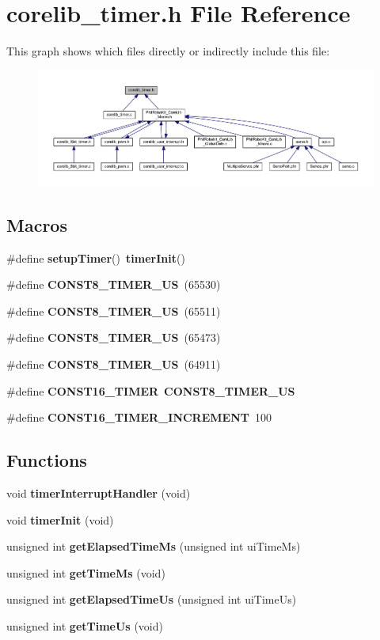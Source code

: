 \section{corelib\-\_\-timer.\-h File Reference}
\label{corelib__timer_8h}
This graph shows which files directly or indirectly include this file\-:\nopagebreak
\begin{figure}[H]
\begin{center}
\leavevmode
\includegraphics[width=350pt]{corelib__timer_8h__dep__incl}
\end{center}
\end{figure}
\subsection*{Macros}
\begin{DoxyCompactItemize}
\item 
\#define {\bf setup\-Timer}()~{\bf timer\-Init}()
\item 
\#define {\bf C\-O\-N\-S\-T8\-\_\-\-T\-I\-M\-E\-R\-\_\-U\-S}~(65530)
\item 
\#define {\bf C\-O\-N\-S\-T8\-\_\-\-T\-I\-M\-E\-R\-\_\-U\-S}~(65511)
\item 
\#define {\bf C\-O\-N\-S\-T8\-\_\-\-T\-I\-M\-E\-R\-\_\-U\-S}~(65473)
\item 
\#define {\bf C\-O\-N\-S\-T8\-\_\-\-T\-I\-M\-E\-R\-\_\-U\-S}~(64911)
\item 
\#define {\bf C\-O\-N\-S\-T16\-\_\-\-T\-I\-M\-E\-R}~{\bf C\-O\-N\-S\-T8\-\_\-\-T\-I\-M\-E\-R\-\_\-U\-S}
\item 
\#define {\bf C\-O\-N\-S\-T16\-\_\-\-T\-I\-M\-E\-R\-\_\-\-I\-N\-C\-R\-E\-M\-E\-N\-T}~100
\end{DoxyCompactItemize}
\subsection*{Functions}
\begin{DoxyCompactItemize}
\item 
void {\bf timer\-Interrupt\-Handler} (void)
\item 
void {\bf timer\-Init} (void)
\item 
unsigned int {\bf get\-Elapsed\-Time\-Ms} (unsigned int ui\-Time\-Ms)
\item 
unsigned int {\bf get\-Time\-Ms} (void)
\item 
unsigned int {\bf get\-Elapsed\-Time\-Us} (unsigned int ui\-Time\-Us)
\item 
unsigned int {\bf get\-Time\-Us} (void)
\end{DoxyCompactItemize}


